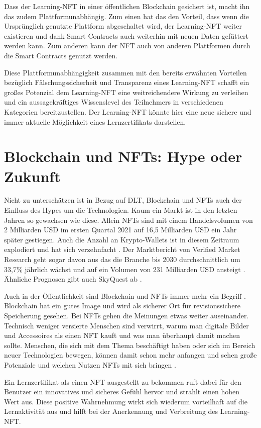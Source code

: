 Dass der Learning-\ac{NFT} in einer öffentlichen Blockchain gesichert ist, macht ihn das zudem Plattformunabhängig.
Zum einen hat das den Vorteil, dass wenn die Ursprünglich genutzte Plattform abgeschaltet wird,
der Learning-\ac{NFT} weiter existieren und dank Smart Contracts auch weiterhin mit neuen Daten gefüttert werden kann.
Zum anderen kann der \ac{NFT} auch von anderen Plattformen durch die Smart Contracts genutzt werden.

Diese Plattformunabhängigkeit zusammen mit den bereits erwähnten Vorteilen bezüglich Fälschungssicherheit und Transparenz
eines Learning-\ac{NFT} schafft ein großes Potenzial dem Learning-\ac{NFT} eine weitreichendere Wirkung zu verleihen
und ein aussagekräftiges \dq Wissenslevel\dq{} des Teilnehmers in verschiedenen Kategorien bereitzustellen.
Der Learning-\ac{NFT} könnte hier eine neue sichere und immer aktuelle Möglichkeit eines Lernzertifikats darstellen.

\section{Blockchain und NFTs: Hype oder Zukunft}

Nicht zu unterschätzen ist in Bezug auf \ac{DLT}, Blockchain und \ac{NFT}s auch der Einfluss des Hypes um die Technologien.
Kaum ein Markt ist in den letzten Jahren so gewachsen wie diese.
Allein \ac{NFT}s sind mit einem Handelsvolumen von 2 Milliarden USD im ersten Quartal 2021 auf 16,5 Milliarden USD ein Jahr später gestiegen.
Auch die Anzahl an Krypto-Wallets ist in diesem Zeitraum explodiert und hat sich verzehnfacht \parencite[vgl.][]{NonFungible.2022}.
Der Marktbericht von Verified Market Research geht sogar davon aus das die Branche bis 2030 durchschnittlich um 33,7\% jährlich wächst und auf ein Volumen von 231 Milliarden USD ansteigt \parencite[vgl.][]{VerifiedMarketResearch.2022}.
Ähnliche Prognosen gibt auch SkyQuest ab \parencite[vgl.][]{Skyquest.2022}.

Auch in der Öffentlichkeit sind Blockchain und \ac{NFT}s immer mehr ein Begriff \parencite[vgl.][]{PSW.2022}.
Blockchain hat ein gutes Image und wird als sicherer Ort für revisionssichere Speicherung gesehen.
Bei \ac{NFT}s gehen die Meinungen etwas weiter auseinander.
Technisch weniger versierte Menschen sind verwirrt, warum man digitale Bilder und Accessoires als einen \ac{NFT} kauft und was man überhaupt damit machen sollte.
Menschen, die sich mit dem Thema beschäftigt haben oder sich im Bereich neuer Technologien bewegen, können damit schon mehr anfangen und sehen große Potenziale und welchen Nutzen NFTs mit sich bringen \parencite[vgl.][]{vparthier.23.04.2022}.

Ein Lernzertifikat als einen \ac{NFT} ausgestellt zu bekommen ruft dabei für den Benutzer ein innovatives und sicheres Gefühl hervor und strahlt einen hohen Wert aus.
Diese positive Wahrnehmung wirkt sich wiederum vorteilhaft auf die Lernaktivität aus und hilft bei der Anerkennung und Verbreitung des Learning-\ac{NFT}. 

